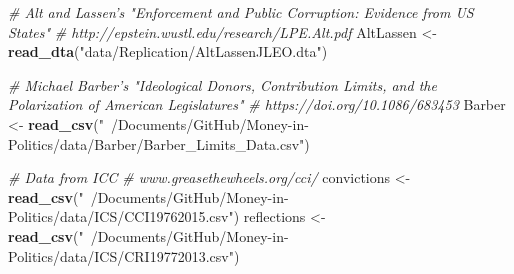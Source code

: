 \documentclass[]{article}
\newenvironment{Shaded}{\begin{snugshade}}{\end{snugshade}}
\newcommand{\KeywordTok}[1]{\textcolor[rgb]{0.13,0.29,0.53}{\textbf{#1}}}
\newcommand{\StringTok}[1]{\textcolor[rgb]{0.31,0.60,0.02}{#1}}
\newcommand{\CommentTok}[1]{\textcolor[rgb]{0.56,0.35,0.01}{\textit{#1}}}
\newcommand{\NormalTok}[1]{#1}
\begin{document}
\begin{Shaded}
\begin{Highlighting}[]
\CommentTok{# Alt and Lassen's "Enforcement and Public Corruption: Evidence from US States"}
\CommentTok{# http://epstein.wustl.edu/research/LPE.Alt.pdf}
\NormalTok{AltLassen <-}\StringTok{ }\KeywordTok{read_dta}\NormalTok{(}\StringTok{"data/Replication/AltLassenJLEO.dta"}\NormalTok{)}

\CommentTok{# Michael Barber's "Ideological Donors, Contribution Limits, and the Polarization of American Legislatures"  }
\CommentTok{# https://doi.org/10.1086/683453}
\NormalTok{Barber <-}\StringTok{ }\KeywordTok{read_csv}\NormalTok{(}\StringTok{"~/Documents/GitHub/Money-in-Politics/data/Barber/Barber_Limits_Data.csv"}\NormalTok{)}

\CommentTok{# Data from ICC }
\CommentTok{# www.greasethewheels.org/cci/}
\NormalTok{convictions <-}\StringTok{ }\KeywordTok{read_csv}\NormalTok{(}\StringTok{"~/Documents/GitHub/Money-in-Politics/data/ICS/CCI19762015.csv"}\NormalTok{)}
\NormalTok{reflections <-}\StringTok{ }\KeywordTok{read_csv}\NormalTok{(}\StringTok{"~/Documents/GitHub/Money-in-Politics/data/ICS/CRI19772013.csv"}\NormalTok{)}
\end{Highlighting}
\end{Shaded}
\end{document}

